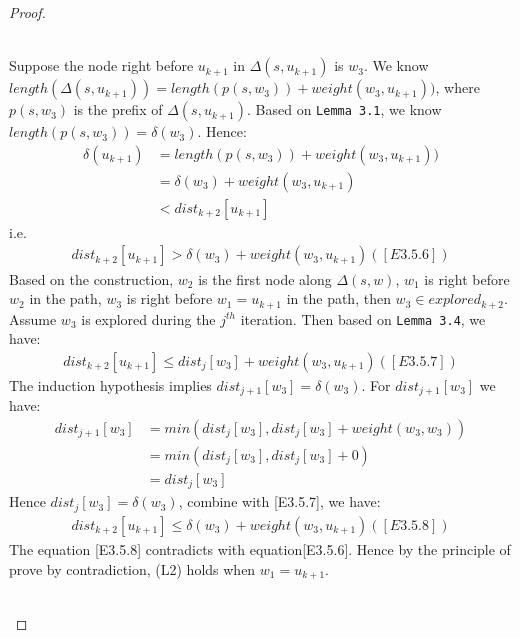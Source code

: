 \documentclass[11pt, oneside]{article}   	%
\theoremstyle{definition}
\begin{document}
\begin{proof}
\begin{itemize}
\begin{enumerate}
  \\
  Suppose the node right before $u_{k+1}$ in $\Delta(s, u_{k+1})$ is $w_3$. We know $length(\Delta(s, u_{k+1})) = length(p(s, w_3)) + weight(w_3, u_{k+1}))$, where $p(s, w_3)$ is the prefix of $\Delta(s, u_{k+1})$. Based on \texttt{Lemma 3.1}, we know $length(p(s, w_3)) = \delta(w_3)$. Hence: 
  \begin{align*}
    \delta(u_{k+1}) &= length(p(s, w_3)) + weight(w_3, u_{k+1})) \\
                    &= \delta(w_3) + weight(w_3, u_{k+1}) \\
                    &< dist_{k+2}[u_{k+1}]
  \end{align*}
  i.e.
  \begin{align*}
    dist_{k+2}[u_{k+1}] > \delta(w_3) + weight(w_3, u_{k+1}) ([E3.5.6])
  \end{align*}
  Based on the construction, $w_2$ is the first node along $\Delta(s,w)$, $w_1$ is right before $w_2$ in the path, $w_3$ is right before $w_1 = u_{k+1}$ in the path, then $w_3 \in explored_{k+2}$. Assume $w_3$ is explored during the $j^{th}$ iteration. Then based on \texttt{Lemma 3.4}, we have: 
  \begin{align*}
    dist_{k+2}[u_{k+1}] \leq dist_j[w_3] + weight(w_3, u_{k+1}) ([E3.5.7])
  \end{align*}
  The induction hypothesis implies $dist_{j+1}[w_3] = \delta(w_3)$. For $dist_{j+1}[w_3]$ we have: 
  \begin{align*}
    dist_{j+1}[w_3] &= min(dist_j[w_3], dist_j[w_3] + weight(w_3, w_3)) \\
                   &= min(dist_j[w_3], dist_j[w_3] + 0) \\
                   &= dist_j[w_3]
  \end{align*}
  Hence $dist_j[w_3] = \delta(w_3)$, combine with [E3.5.7], we have: 
  \begin{align*}
    dist_{k+2}[u_{k+1}] \leq \delta(w_3) + weight(w_3, u_{k+1}) ([E3.5.8])
  \end{align*}
  The equation [E3.5.8] contradicts with equation[E3.5.6]. Hence by the principle of prove by contradiction, (L2) holds when $w_1 = u_{k+1}$. 
  \\\\


\end{enumerate}
\end{itemize}
\end{proof}
\end{document}
